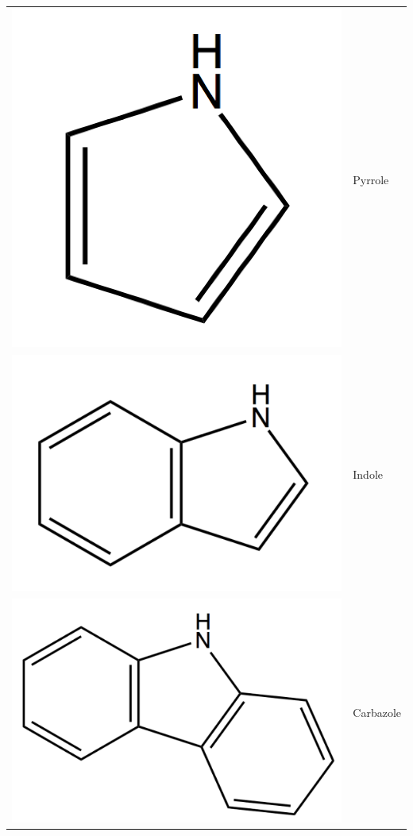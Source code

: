 \documentclass[12pt,a4paper]{book}
\begin{document}
\begin{table}[h!]
\begin{center}
\begin{tabular}{rl}
			\includegraphics[scale=0.08]{../image/pyrrole} & Pyrrole \\
			\includegraphics[scale=0.08]{../image/Indole} & Indole \\
			\includegraphics[scale=0.08]{../image/carbazole} & Carbazole \\

\end{tabular}
\end{center}
\end{table}
\end{document}
